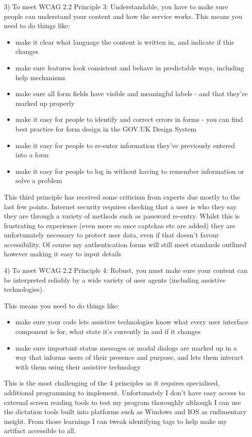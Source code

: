 3)
To meet WCAG 2.2 Principle 3: Understandable, you have to make sure people can understand your content and how the service works.
This means you need to do things like:
\begin{itemize}
\item make it clear what language the content is written in, and indicate if this changes
\item make sure features look consistent and behave in predictable ways, including help mechanisms
\item make sure all form fields have visible and meaningful labels - and that they're marked up properly
\item make it easy for people to identify and correct errors in forms - you can find best practice for form design in the GOV.UK Design System
\item make it easy for people to re-enter information they've previously entered into a form
\item make it easy for people to log in without having to remember information or solve a problem
\end{itemize}
This third principle has received some criticism from experts due mostly to the last few points. Internet security requires checking that a user is who they say they are through a variety of methods such as password re-entry. Whilst this is frustrating to experience (even more so once captchas etc are added) they are unfortunately necessary to protect user data, even if that doesn't favour accessibility. Of course my authentication forms will still meet standards outlined however making it easy to input details 

4)
To meet WCAG 2.2 Principle 4: Robust, you must make sure your content can be interpreted reliably by a wide variety of user agents (including assistive technologies).

This means you need to do things like:
\begin{itemize}
\item make sure your code lets assistive technologies know what every user interface component is for, what state it's currently in and if it changes
\item make sure important status messages or modal dialogs are marked up in a way that informs users of their presence and purpose, and lets them interact with them using their assistive technology
\end{itemize}

This is the most challenging of the 4 principles as it requires specialised, additional programming to implement. Unfortunately I don't have easy access to external screen reading tools to test my program thoroughly although I can use the dictation tools built into platforms such as Windows and IOS as rudimentary insight. From those learnings I can tweak identifying tags to help make my artifact accessible to all.
